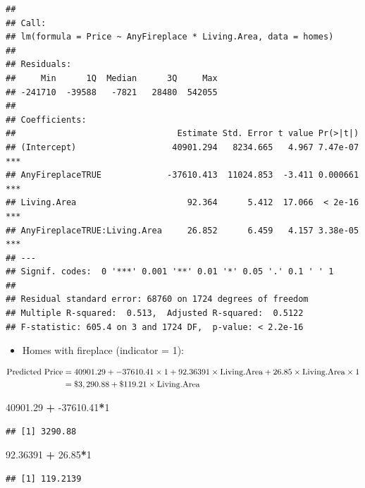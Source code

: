 \documentclass[
]{book}
\newenvironment{Shaded}{\begin{snugshade}}{\end{snugshade}}
\newcommand{\DecValTok}[1]{\textcolor[rgb]{0.00,0.00,0.81}{#1}}
\newcommand{\FloatTok}[1]{\textcolor[rgb]{0.00,0.00,0.81}{#1}}
\newcommand{\OperatorTok}[1]{\textcolor[rgb]{0.81,0.36,0.00}{\textbf{#1}}}
\newcommand{\StringTok}[1]{\textcolor[rgb]{0.31,0.60,0.02}{#1}}
\providecommand{\tightlist}{%
  \setlength{\itemsep}{0pt}\setlength{\parskip}{0pt}}
\begin{document}
\begin{verbatim}
## 
## Call:
## lm(formula = Price ~ AnyFireplace * Living.Area, data = homes)
## 
## Residuals:
##     Min      1Q  Median      3Q     Max 
## -241710  -39588   -7821   28480  542055 
## 
## Coefficients:
##                                Estimate Std. Error t value Pr(>|t|)    
## (Intercept)                   40901.294   8234.665   4.967 7.47e-07 ***
## AnyFireplaceTRUE             -37610.413  11024.853  -3.411 0.000661 ***
## Living.Area                      92.364      5.412  17.066  < 2e-16 ***
## AnyFireplaceTRUE:Living.Area     26.852      6.459   4.157 3.38e-05 ***
## ---
## Signif. codes:  0 '***' 0.001 '**' 0.01 '*' 0.05 '.' 0.1 ' ' 1
## 
## Residual standard error: 68760 on 1724 degrees of freedom
## Multiple R-squared:  0.513,	Adjusted R-squared:  0.5122 
## F-statistic: 605.4 on 3 and 1724 DF,  p-value: < 2.2e-16
\end{verbatim}

\begin{itemize}
\tightlist
\item
  Homes with fireplace (indicator = 1):
\end{itemize}

\begin{align*}
\hbox{Predicted Price} &= 40901.29 + -37610.41 \times 1 + 92.36391 \times \hbox{Living.Area} + 26.85 \times \hbox{Living.Area} \times 1 \\
& = \$3,290.88 + \$119.21 \times \hbox{Living.Area}
\end{align*}

\begin{Shaded}
\begin{Highlighting}[]
\FloatTok{40901.29} \OperatorTok{+}\StringTok{ }\FloatTok{-37610.41}\OperatorTok{*}\DecValTok{1}
\end{Highlighting}
\end{Shaded}

\begin{verbatim}
## [1] 3290.88
\end{verbatim}

\begin{Shaded}
\begin{Highlighting}[]
\FloatTok{92.36391} \OperatorTok{+}\StringTok{ }\FloatTok{26.85}\OperatorTok{*}\DecValTok{1}
\end{Highlighting}
\end{Shaded}

\begin{verbatim}
## [1] 119.2139
\end{verbatim}
\end{document}
